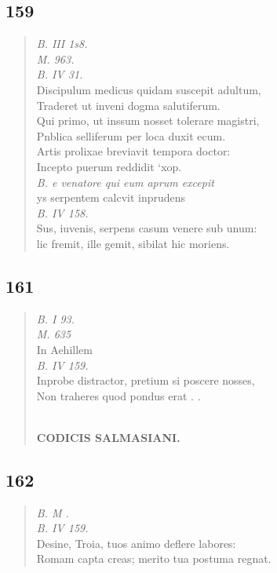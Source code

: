 \documentclass[11pt, a4paper]{report}
\begin{document}
            \subsection*{159}
      \begin{verse}
      \textit{B. III 1s8.} \\ \textit{M. 963.} \\ \textit{B. IV 31.} \\ Discipulum medicus quidam suscepit adultum, \\ Traderet ut inveni dogma salutiferum. \\ Qui primo, ut inssum nosset tolerare magistri, \\ Pnblica selliferum per loca duxit ecum. \\ Artis prolixae breviavit tempora doctor: \\ Incepto puerum reddidit ‘xop. \\ 
        ﻿\pagebreak 
     \marginpar{[160]} \textit{B. e venatore qui eum aprum excepit} \\ ys serpentem calcvit inprudens \\ \textit{B. IV 158.} \\ Sus, iuvenis, serpens casum venere sub unum: \\ lic fremit, ille gemit, sibilat hic moriens. \\ 
      \end{verse}
  
            \subsection*{161}
      \begin{verse}
      \textit{B. I 93.} \\ \textit{M. 635} \\ In Aehillem \\ \textit{B. IV 159.} \\ Inprobe distractor, pretium si poscere nosses, \\ Non traheres quod pondus erat . . \\ 
        ﻿\pagebreak 
    \begin{center} \textbf{CODICIS SALMASIANI.} \end{center} \marginpar{[149]} 
      \end{verse}
  
            \subsection*{162}
      \begin{verse}
      \textit{B. M .} \\ \textit{B. IV 159.} \\ Desine, Troia, tuos animo deflere labores: \\ Romam capta creas; merito tua postuma regnat. \\ 
      \end{verse}
  
\end{document}
